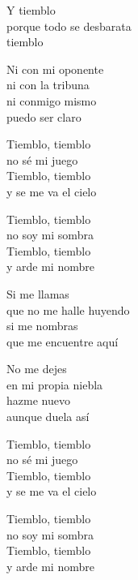 \begin{lyrics}
Y tiemblo\\
porque todo se desbarata\\
tiemblo

Ni con mi oponente\\
ni con la tribuna\\
ni conmigo mismo\\
puedo ser claro

Tiemblo, tiemblo\\
no sé mi juego\\
Tiemblo, tiemblo\\
y se me va el cielo

Tiemblo, tiemblo\\
no soy mi sombra\\
Tiemblo, tiemblo\\
y arde mi nombre

Si me llamas\\
que no me halle huyendo\\
si me nombras\\
que me encuentre aquí

No me dejes\\
en mi propia niebla\\
hazme nuevo\\
aunque duela así

Tiemblo, tiemblo\\
no sé mi juego\\
Tiemblo, tiemblo\\
y se me va el cielo

Tiemblo, tiemblo\\
no soy mi sombra\\
Tiemblo, tiemblo\\
y arde mi nombre
\end{lyrics}

